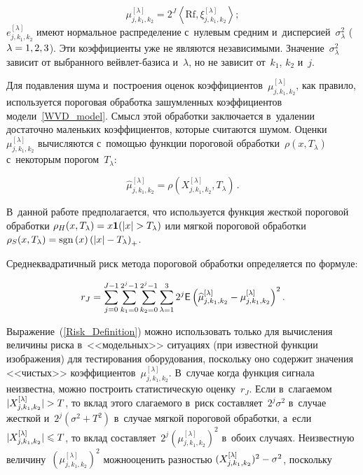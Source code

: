 \begin{multicols}{2}
\noindent
$$
\mu_{j,k_1,k_2}^{[\lambda]} =  2^J\left\langle \mathrm{Rf}, 
\xi_{j,k_1,k_2}^{[\lambda]}\right\rangle;
$$
$e^{[\lambda]}_{j,k_1,k_2}$ 
имеют нормальное распределение с~нулевым средним 
и~дисперсией~$\sigma^2_\lambda$ ($\lambda\hm=1,2,3$). Эти коэффициенты 
уже не являются независимыми. Значение~$\sigma^2_\lambda$ зависит от 
выбранного вейв\-лет-ба\-зи\-са и~$\lambda$, но не зависит 
от~$k_1$, $k_2$ и~$j$.

Для подавления шума и~построения оценок 
коэффициентов~$\mu_{j,k_1,k_2}^{[\lambda]}$, как правило, используется 
пороговая обработка зашумленных коэффициентов модели~\eqref{WVD_model}. 
Смысл этой обработки заключается в~удалении достаточно маленьких 
коэффициентов, которые считаются шумом. Оценки~$\mu_{j,k_1,k_2}^{[\lambda]}$ 
вы\-чис\-ля\-ют\-ся с~по\-мощью функции пороговой обработки~$\rho(x,T_{\lambda})$ 
с~некоторым порогом~$T_{\lambda}$: 

\noindent
$$
\widehat{\mu}_{j,k_1,k_2}^{[\lambda]}
=\rho\left(X_{j,k_1,k_2}^{[\lambda]},T_{\lambda}\right)\,.
$$
 
В~данной работе предполагается, что используется функция жесткой 
пороговой обработки $\rho_{H}(x,T_{\lambda})\hm=x\mathbf{1}(\abs{x}\hm>T_{\lambda})$ 
или мягкой пороговой обработки 
$\rho_{S}(x,T_{\lambda})\hm=\mathrm{sgn}\,(x)\left(\abs{x}\hm-
T_{\lambda}\right)_{+}$.

\pagebreak

Среднеквадратичный риск метода пороговой обработки определяется по формуле:

\vspace*{2pt}

\noindent
\begin{equation}
\label{Risk_Definition}
r_J = \sum\limits_{j = 0}^{J - 1}\sum\limits_{k_1=0}^{2^j-1}
\sum\limits_{k_2=0}^{2^j-1}\sum\limits_{\lambda=1}^3 2^j
{\sf E}\left(\widehat{\mu}_{j,k_1,k_2}^{[\lambda]}-
\mu_{j,k_1,k_2}^{[\lambda]} \right)^2.
\end{equation}

Выражение~(\ref{Risk_Definition}) можно использовать только 
для вычисления величины риска в~<<модельных>> ситуациях (при известной 
функции изображения) для тес\-ти\-ро\-ва\-ния оборудования, поскольку оно 
содержит значения <<чистых>> коэффициентов~$\mu_{j,k_1,k_2}^{[\lambda]}$. 
В~случае когда функция сигнала неизвестна, можно построить статистическую
 оценку~$r_J$. Если в~сла\-га\-емом $\vert X_{j,k_1,k_2}^{[\lambda]}\vert\hm>T$, 
 то вклад этого слагаемого в~риск составляет~$2^j\sigma^2$ в~случае жесткой 
 и~$2^j(\sigma^2+T^2)$ в~случае мягкой пороговой обработки, а~если 
 $\vert X_{j,k_1,k_2}^{[\lambda]}\vert\hm\leqslant T$, то вклад 
 составляет~$2^j(\mu_{j,k_1,k_2}^{[\lambda]})^2$ в~обоих случаях.
  Неизвестную величину~$(\mu_{j,k_1,k_2}^{[\lambda]})^2$ 
  можно\linebreak оценить разностью $(X_{j,k_1,k_2}^{[\lambda]})^2
  \hm-\sigma^2$, поскольку 
  

\end{multicols}
